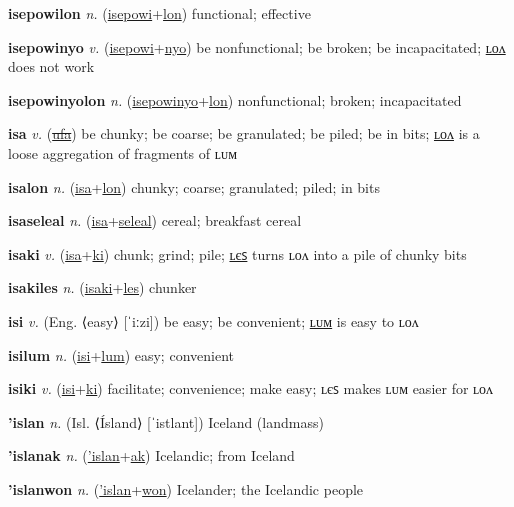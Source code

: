 \textbf{\hypertarget{isepowilon}{isepowilon}} \textit{n.} (\hyperlink{isepowi}{isepowi}+\allowbreak \hyperlink{lon}{lon})
functional; effective

\textbf{\hypertarget{isepowinyo}{isepowinyo}} \textit{v.} (\hyperlink{isepowi}{isepowi}+\allowbreak \hyperlink{nyo}{nyo})
be nonfunctional; be broken; be incapacitated; \hyperlink{isepowinyolon}{ʟᴏᴧ} does not work

\textbf{\hypertarget{isepowinyolon}{isepowinyolon}} \textit{n.} (\hyperlink{isepowinyo}{isepowinyo}+\allowbreak \hyperlink{lon}{lon})
nonfunctional; broken; incapacitated

\textbf{\hypertarget{isa}{isa}} \textit{v.} (\hyperlink{ufa}{\sout{ufa}})
be chunky; be coarse; be granulated; be piled; be in bits; \hyperlink{isalon}{ʟᴏᴧ} is a loose aggregation of fragments of ʟᴜᴍ

\textbf{\hypertarget{isalon}{isalon}} \textit{n.} (\hyperlink{isa}{isa}+\allowbreak \hyperlink{lon}{lon})
chunky; coarse; granulated; piled; in bits

\textbf{\hypertarget{isaseleal}{isaseleal}} \textit{n.} (\hyperlink{isa}{isa}+\allowbreak \hyperlink{seleal}{seleal})
cereal; breakfast cereal

\textbf{\hypertarget{isaki}{isaki}} \textit{v.} (\hyperlink{isa}{isa}+\allowbreak \hyperlink{ki}{ki})
chunk; grind; pile; \hyperlink{isakiles}{ʟєꜱ} turns ʟᴏᴧ into a pile of chunky bits

\textbf{\hypertarget{isakiles}{isakiles}} \textit{n.} (\hyperlink{isaki}{isaki}+\allowbreak \hyperlink{les}{les})
chunker

\textbf{\hypertarget{isi}{isi}} \textit{v.} (Eng. ⟨easy⟩ [ˈiːzi])
be easy; be convenient; \hyperlink{isilum}{ʟᴜᴍ} is easy to ʟᴏᴧ

\textbf{\hypertarget{isilum}{isilum}} \textit{n.} (\hyperlink{isi}{isi}+\allowbreak \hyperlink{lum}{lum})
easy; convenient

\textbf{\hypertarget{isiki}{isiki}} \textit{v.} (\hyperlink{isi}{isi}+\allowbreak \hyperlink{ki}{ki})
facilitate; convenience; make easy; ʟєꜱ makes ʟᴜᴍ easier for ʟᴏᴧ

\textbf{\hypertarget{'islan}{'islan}} \textit{n.} (Isl. ⟨Ísland⟩ [ˈistlant])
Iceland (landmass)

\textbf{\hypertarget{'islanak}{'islanak}} \textit{n.} (\hyperlink{'islan}{'islan}+\allowbreak \hyperlink{ak}{ak})
Icelandic; from Iceland

\textbf{\hypertarget{'islanwon}{'islanwon}} \textit{n.} (\hyperlink{'islan}{'islan}+\allowbreak \hyperlink{won}{won})
Icelander; the Icelandic people

